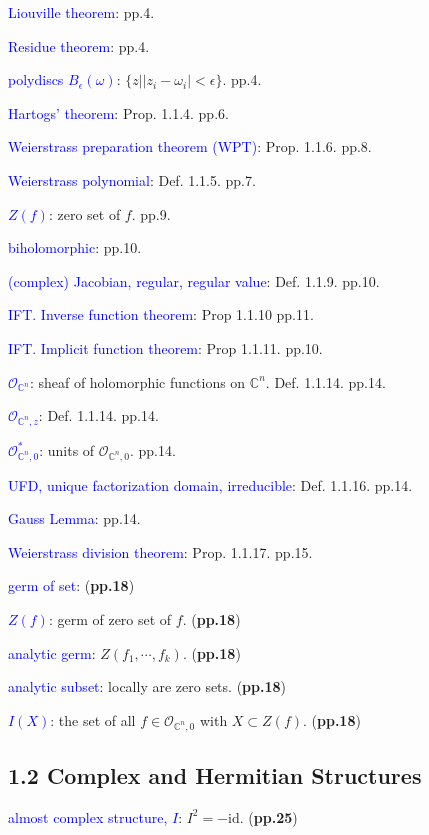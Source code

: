 \documentclass{book}
\numberwithin{equation}{subsection} %
\theoremstyle{definition}
\begin{document}
    \textcolor{blue}{Liouville theorem}: pp.4.
    
    \textcolor{blue}{Residue theorem}: pp.4.
    
    \textcolor{blue}{polydiscs $B_\epsilon(\omega)$}: $\{z| |z_i-\omega_i| <\epsilon\} $.  pp.4.
    
    \textcolor{blue}{Hartogs' theorem}: Prop. 1.1.4. pp.6.
    
    \textcolor{blue}{Weierstrass preparation theorem (WPT)}:
    Prop. 1.1.6. pp.8.
    
    \textcolor{blue}{Weierstrass polynomial}: Def. 1.1.5. pp.7.
    
    \textcolor{blue}{$Z(f)$}: zero set of $f$. pp.9.
    
    \textcolor{blue}{biholomorphic}: pp.10.
    
    \textcolor{blue}{(complex) Jacobian, regular, regular value}: Def. 1.1.9. pp.10.
    
    \textcolor{blue}{IFT. Inverse function theorem}: Prop 1.1.10 pp.11.
    
    \textcolor{blue}{IFT. Implicit function theorem}: Prop 1.1.11. pp.10.
    
    \textcolor{blue}{$\mathcal{O}_{\mathbb{C}^n}$}:
    sheaf of holomorphic functions on $\mathbb{C}^n$. Def. 1.1.14. pp.14.
    
    \textcolor{blue}{$\mathcal{O}_{\mathbb{C}^n,z}$}: Def. 1.1.14. pp.14.
    
    \textcolor{blue}{$\mathcal{O}^*_{\mathbb{C}^n,0}$}:
    units of $\mathcal{O}_{\mathbb{C}^n,0}$. pp.14.
    
    \textcolor{blue}{UFD, unique factorization domain, irreducible}: 
    Def. 1.1.16. pp.14.
    
    \textcolor{blue}{Gauss Lemma}: pp.14.
    
    \textcolor{blue}{Weierstrass division theorem}: Prop. 1.1.17. pp.15.
    
    \textcolor{blue}{germ of set}: (\textbf{pp.18})

    \textcolor{blue}{$Z(f)$}: germ of zero set of $f$. (\textbf{pp.18})

    \textcolor{blue}{analytic germ}: $Z(f_1,\cdots,f_k)$. (\textbf{pp.18})

    \textcolor{blue}{analytic subset}: locally are zero sets. (\textbf{pp.18})

    \textcolor{blue}{$I(X)$}: the set of all $f\in
    \mathcal{O}_{\mathbb{C}^n,0}$ with $X\subset Z(f)$. (\textbf{pp.18})
    \subsection{1.2 Complex and Hermitian Structures}
    \textcolor{blue}{almost complex structure, $I$}: $I^2=-\text{id}$.
    (\textbf{pp.25})
\end{document}
